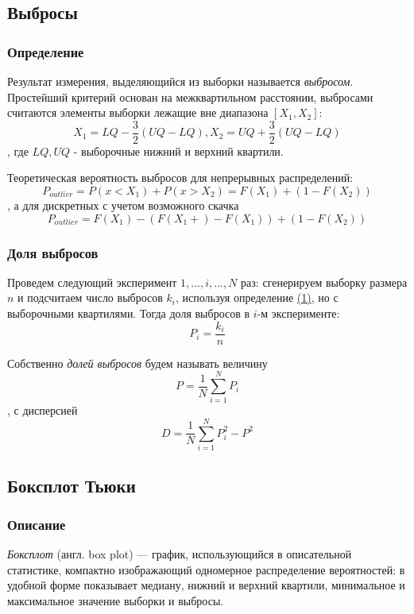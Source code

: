 \documentclass[12pt,a4paper]{article}
\begin{document}
\subsection{Выбросы}
\subsubsection{Определение}
Результат измерения, выделяющийся из выборки называется \textit{выбросом}. Простейший критерий основан на межквартильном расстоянии, выбросами считаются элементы выборки лежащие вне диапазона $[X_1, X_2]$:
\begin{equation}\label{14}
X_1=LQ - \frac{3}{2}(UQ-LQ), X_2=UQ + \frac{3}{2}(UQ-LQ)
\end{equation}, где $LQ, UQ$ - выборочные нижний и верхний квартили.

Теоретическая вероятность выбросов для непрерывных распределений:
\begin{equation}\label{15}
P_{outlier} = P(x<X_1) + P(x>X_2) = F(X_1) + (1 - F(X_2))
\end{equation}
, а для дискретных с учетом возможного скачка
\begin{equation}\label{16}
P_{outlier} = F(X_1) - (F(X_1+) - F(X_1)) + (1 - F(X_2))
\end{equation}

\subsubsection{Доля выбросов}
Проведем следующий эксперимент $1,...,i,...,N$ раз: сгенерируем выборку размера $n$ и подсчитаем число выбросов $k_i$, используя определение \hyperref[1]{(1)}, но с выборочными квартилями. Тогда доля выбросов в $i$-м эксперименте:
\begin{equation}
P_i = \frac{k_i}{n}
\end{equation}

Собственно \textit{долей выбросов} будем называть величину
\begin{equation}\label{17}
P = \frac{1}{N}\sum_{i=1}^{N} P_i
\end{equation},
с дисперсией
\begin{equation}\label{18}
D = \frac{1}{N}\sum_{i=1}^{N} P_i^2 - P^2
\end{equation}

\subsection{Боксплот Тьюки}
\subsubsection{Описание}
\textit{Боксплот} (англ. box plot) — график, использующийся в описательной статистике, компактно изображающий одномерное распределение вероятностей: в удобной форме показывает медиану, нижний и верхний квартили, минимальное и максимальное значение выборки и выбросы.\cite{boxplot}
\end{document}
